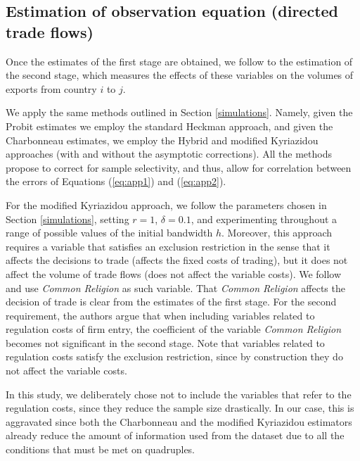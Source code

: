\subsection{Estimation of observation equation (directed trade flows)}

Once the estimates of the first stage are obtained, we follow to the estimation of the second stage, which measures the effects of these variables on the volumes of exports from country $i$ to $j$. 

We apply the same methods outlined in Section \ref{simulations}. Namely, given the Probit estimates we employ the standard Heckman approach, and given the Charbonneau estimates, we employ the Hybrid and modified Kyriazidou approaches (with and without the asymptotic corrections). All the methods propose to correct for sample selectivity, and thus, allow for correlation between the errors of Equations (\ref{eq:app1}) and (\ref{eq:app2}).

For the modified Kyriazidou approach, we follow the parameters chosen in Section \ref{simulations}, setting $r=1$, $\delta = 0.1$, and experimenting throughout a range of possible values of the initial bandwidth $h$. Moreover, this approach requires a variable that satisfies an exclusion restriction in the sense that it affects the decisions to trade (affects the fixed costs of trading), but it does not affect the volume of trade flows (does not affect the variable costs). We follow \cite{helpman2008estimating} and use \textit{Common Religion} as such variable. That \textit{Common Religion} affects the decision of trade is clear from the estimates of the first stage. For the second requirement, the authors argue that when including variables related to regulation costs of firm entry, the coefficient of the variable \textit{Common Religion} becomes not significant in the second stage. Note that variables related to regulation costs satisfy the exclusion restriction, since by construction they do not affect the variable costs.

In this study, we deliberately chose not to include the variables that refer to the regulation costs, since they reduce the sample size drastically. In our case, this is aggravated since both the Charbonneau and the modified Kyriazidou estimators already reduce the amount of information used from the dataset due to all the conditions that must be met on quadruples.

